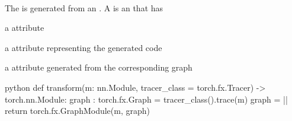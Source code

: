 \begin{defnbox}\nospacing
    \begin{defn}\label{defn:torch_fx_code_generation}\leavevmode\\
        The  is generated from an .
        A  is an  that has
        \begin{itemizenosep}
            \item a  attribute
            \item a  attribute representing the generated code
            \item a  attribute generated from the corresponding graph
        \end{itemizenosep}
        \begin{mintlinebox}{python}
            def transform(m: nn.Module, tracer_class = torch.fx.Tracer)
                    -> torch.nn.Module:
              graph : torch.fx.Graph = tracer_class().trace(m)
              graph = |\texttt{}|
              return torch.fx.GraphModule(m, graph)
        \end{mintlinebox}
    \end{defn}
\end{defnbox}


